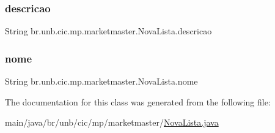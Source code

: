 \subsubsection{\texorpdfstring{descricao}{descricao}}
{\footnotesize\ttfamily String br.\+unb.\+cic.\+mp.\+marketmaster.\+Nova\+Lista.\+descricao\hspace{0.3cm}{\ttfamily [private]}}

\mbox{\label{classbr_1_1unb_1_1cic_1_1mp_1_1marketmaster_1_1NovaLista_ad14f3bcef37ea464594a6353c6fb6d8e}} 
\subsubsection{\texorpdfstring{nome}{nome}}
{\footnotesize\ttfamily String br.\+unb.\+cic.\+mp.\+marketmaster.\+Nova\+Lista.\+nome\hspace{0.3cm}{\ttfamily [private]}}



The documentation for this class was generated from the following file\+:\begin{DoxyCompactItemize}
\item 
main/java/br/unb/cic/mp/marketmaster/\mbox{\hyperlink{NovaLista_8java}{Nova\+Lista.\+java}}\end{DoxyCompactItemize}
